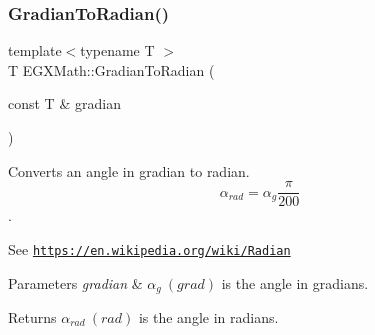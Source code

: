 \subsubsection{\texorpdfstring{Gradian\+To\+Radian()}{GradianToRadian()}}
{\footnotesize\ttfamily template$<$typename T $>$ \\
T E\+G\+X\+Math\+::\+Gradian\+To\+Radian (\begin{DoxyParamCaption}\item[{const T \&}]{gradian }\end{DoxyParamCaption})}



Converts an angle in gradian to radian. \[\alpha_{rad}=\alpha_{g}\frac{\pi}{200}\]. 

See \href{https://en.wikipedia.org/wiki/Radian}{\tt https\+://en.\+wikipedia.\+org/wiki/\+Radian} 
\begin{DoxyParams}{Parameters}
{\em gradian} & $\alpha_{g}\ (grad)$ is the angle in gradians. \\
\hline
\end{DoxyParams}
\begin{DoxyReturn}{Returns}
$\alpha_{rad}\ (rad)$ is the angle in radians. 
\end{DoxyReturn}
